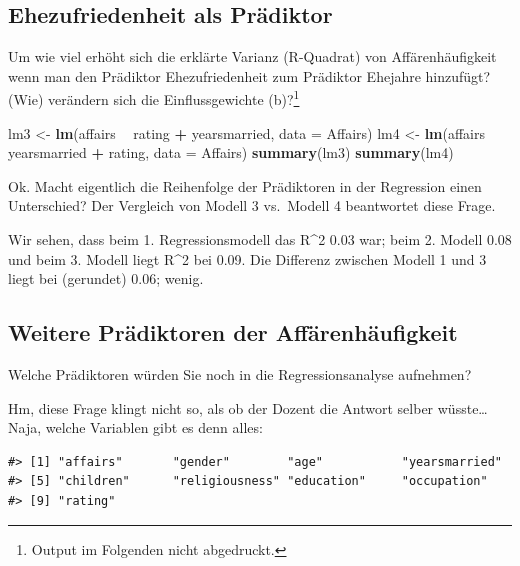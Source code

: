\documentclass[12pt,ngerman,]{book}
\makeatletter
\newenvironment{Shaded}{\begin{snugshade}}{\end{snugshade}}
\newcommand{\KeywordTok}[1]{\textcolor[rgb]{0.13,0.29,0.53}{\textbf{#1}}}
\newcommand{\DataTypeTok}[1]{\textcolor[rgb]{0.13,0.29,0.53}{#1}}
\newcommand{\StringTok}[1]{\textcolor[rgb]{0.31,0.60,0.02}{#1}}
\newcommand{\OperatorTok}[1]{\textcolor[rgb]{0.81,0.36,0.00}{\textbf{#1}}}
\newcommand{\NormalTok}[1]{#1}
\let\rmarkdownfootnote\footnote%
\def\footnote{\protect\rmarkdownfootnote}
\newenvironment{kframe}{%
\medskip{}
\setlength{\fboxsep}{.8em}
 \def\at@end@of@kframe{}%
 \ifinner\ifhmode%
  \def\at@end@of@kframe{\end{minipage}}%
  \begin{minipage}{\columnwidth}%
 \fi\fi%
 \def\FrameCommand##1{\hskip\@totalleftmargin \hskip-\fboxsep
 \colorbox{shadecolor}{##1}\hskip-\fboxsep
     \hskip-\linewidth \hskip-\@totalleftmargin \hskip\columnwidth}%
 \MakeFramed {\advance\hsize-\width
   \@totalleftmargin\z@ \linewidth\hsize
   \@setminipage}}%
 {\par\unskip\endMakeFramed%
 \at@end@of@kframe}
\renewenvironment{Shaded}{\begin{kframe}}{\end{kframe}}
\theoremstyle{definition}
\theoremstyle{definition}
\theoremstyle{remark}
\makeatother
\begin{document}
\subsection{Ehezufriedenheit als
Prädiktor}\label{ehezufriedenheit-als-pradiktor}

Um wie viel erhöht sich die erklärte Varianz (R-Quadrat) von
Affärenhäufigkeit wenn man den Prädiktor Ehezufriedenheit zum Prädiktor
Ehejahre hinzufügt? (Wie) verändern sich die Einflussgewichte
(b)?\footnote{Output im Folgenden nicht abgedruckt.}

\begin{Shaded}
\begin{Highlighting}[]
\NormalTok{lm3 <-}\StringTok{ }\KeywordTok{lm}\NormalTok{(affairs }\OperatorTok{~}\StringTok{ }\NormalTok{rating }\OperatorTok{+}\StringTok{ }\NormalTok{yearsmarried, }\DataTypeTok{data =}\NormalTok{ Affairs)}
\NormalTok{lm4 <-}\StringTok{ }\KeywordTok{lm}\NormalTok{(affairs }\OperatorTok{~}\StringTok{ }\NormalTok{yearsmarried }\OperatorTok{+}\StringTok{ }\NormalTok{rating, }\DataTypeTok{data =}\NormalTok{ Affairs)}
\KeywordTok{summary}\NormalTok{(lm3)}
\KeywordTok{summary}\NormalTok{(lm4)}
\end{Highlighting}
\end{Shaded}

Ok. Macht eigentlich die Reihenfolge der Prädiktoren in der Regression
einen Unterschied? Der Vergleich von Modell 3 vs.~Modell 4 beantwortet
diese Frage.

Wir sehen, dass beim 1. Regressionsmodell das R\^{}2 0.03 war; beim 2.
Modell 0.08 und beim 3. Modell liegt R\^{}2 bei 0.09. Die Differenz
zwischen Modell 1 und 3 liegt bei (gerundet) 0.06; wenig.

\subsection{Weitere Prädiktoren der
Affärenhäufigkeit}\label{weitere-pradiktoren-der-affarenhaufigkeit}

Welche Prädiktoren würden Sie noch in die Regressionsanalyse aufnehmen?

Hm, diese Frage klingt nicht so, als ob der Dozent die Antwort selber
wüsste\ldots{} Naja, welche Variablen gibt es denn alles:

\begin{verbatim}
#> [1] "affairs"       "gender"        "age"           "yearsmarried" 
#> [5] "children"      "religiousness" "education"     "occupation"   
#> [9] "rating"
\end{verbatim}
\end{document}
